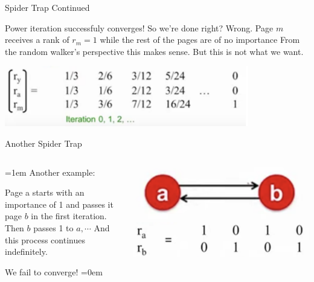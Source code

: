 \documentclass{beamer}
\begin{document}
\begin{frame}[t]{Spider Trap Continued}
\begin{outline}
    \1 Power iteration successfuly converges! So we're done right?
    \1 Wrong. Page $m$ receives a rank of $r_m = 1$ while the rest of the pages are of no importance
    \1 From the random walker's perspective this makes sense. But this is not what we want.
    
    \begin{center}
        \includegraphics[width=0.8\textwidth]{spider1b.png}
    \end{center}
\end{outline}
\end{frame}
\begin{frame}{Another Spider Trap}
\begin{columns}
    \begin{column}{0.5\textwidth}
        \parskip=1em
        Another example:

    Page a starts with an importance
    of 1 and passes it page $b$ in the first
    iteration. Then $b$ passes 1 to $a, \cdots$
    And this process continues 
    indefinitely.

    We fail to converge!
    \parskip=0em
    \end{column}
    \begin{column}{0.5\textwidth}
        \includegraphics[width=\textwidth]{spider2a.png}    
        \includegraphics[width=\textwidth]{spider2b.png}    
    \end{column}
\end{columns}
\end{frame}
\end{document}
